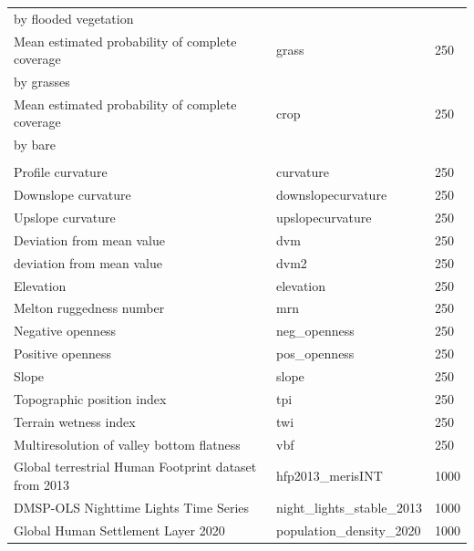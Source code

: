 \documentclass[
  10pt,
  b5paper,
  oneside]{book}
\begin{document}
\begin{longtable}[t]{lll}
\hspace{1em}by flooded vegetation &  & \\
\hspace{1em}Mean estimated probability of complete coverage & grass & 250\\
\hspace{1em}by grasses &  & \\
\hspace{1em}Mean estimated probability of complete coverage & crop & 250\\
\hspace{1em}by bare &  & \\
\addlinespace[0.3em]
\multicolumn{3}{l}{\textbf{Terrain}}\\
\hspace{1em}Profile curvature & curvature & 250\\
\hspace{1em}Downslope curvature & downslopecurvature & 250\\
\hspace{1em}Upslope curvature & upslopecurvature & 250\\
\hspace{1em}Deviation from mean value & dvm & 250\\
\hspace{1em}deviation from mean value & dvm2 & 250\\
\hspace{1em}Elevation & elevation & 250\\
\hspace{1em}Melton ruggedness number & mrn & 250\\
\hspace{1em}Negative openness & neg\_openness & 250\\
\hspace{1em}Positive openness & pos\_openness & 250\\
\hspace{1em}Slope & slope & 250\\
\hspace{1em}Topographic position index & tpi & 250\\
\hspace{1em}Terrain wetness index & twi & 250\\
\hspace{1em}Multiresolution of valley bottom flatness & vbf & 250\\
Global terrestrial Human Footprint dataset from 2013 & hfp2013\_merisINT & 1000\\
DMSP-OLS Nighttime Lights Time Series & night\_lights\_stable\_2013 & 1000\\
Global Human Settlement Layer 2020 & population\_density\_2020 & 1000\\*
\end{longtable}
\endgroup{}
\end{document}
